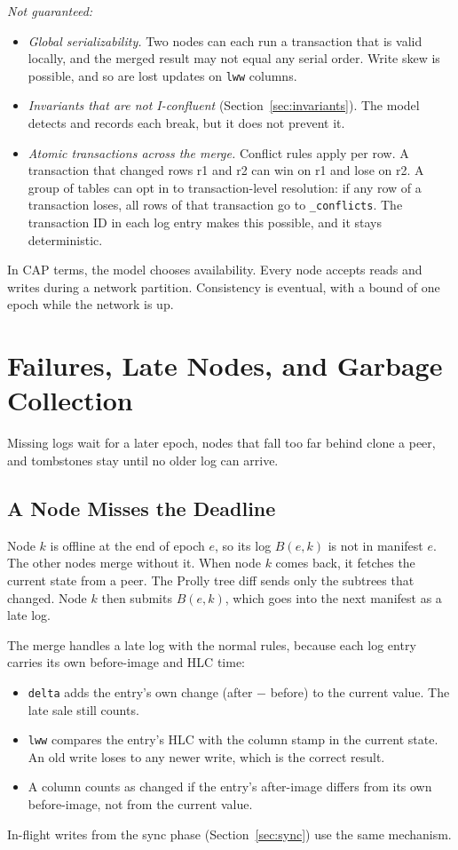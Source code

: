 \documentclass[journal]{IEEEtran}
\newcommand{\code}[1]{\texttt{#1}}
\begin{document}
\emph{Not guaranteed:}
\begin{itemize}
\item \emph{Global serializability.} Two nodes can each run a transaction that is valid locally, and the merged result may not equal any serial order. Write skew is possible, and so are lost updates on \code{lww} columns.
\item \emph{Invariants that are not I-confluent} (Section~\ref{sec:invariants}). The model detects and records each break, but it does not prevent it.
\item \emph{Atomic transactions across the merge.} Conflict rules apply per row. A transaction that changed rows r1 and r2 can win on r1 and lose on r2. A group of tables can opt in to transaction-level resolution: if any row of a transaction loses, all rows of that transaction go to \code{\_conflicts}. The transaction ID in each log entry makes this possible, and it stays deterministic.
\end{itemize}
In CAP terms, the model chooses availability. Every node accepts reads and writes during a network partition. Consistency is eventual, with a bound of one epoch while the network is up.

\section{Failures, Late Nodes, and Garbage Collection}
Missing logs wait for a later epoch, nodes that fall too far behind clone a peer, and tombstones stay until no older log can arrive.

\subsection{A Node Misses the Deadline}\label{sec:late}
Node $k$ is offline at the end of epoch $e$, so its log $B(e,k)$ is not in manifest $e$. The other nodes merge without it. When node $k$ comes back, it fetches the current state from a peer. The Prolly tree diff sends only the subtrees that changed. Node $k$ then submits $B(e,k)$, which goes into the next manifest as a late log.

The merge handles a late log with the normal rules, because each log entry carries its own before-image and HLC time:
\begin{itemize}
\item \code{delta} adds the entry's own change (after $-$ before) to the current value. The late sale still counts.
\item \code{lww} compares the entry's HLC with the column stamp in the current state. An old write loses to any newer write, which is the correct result.
\item A column counts as changed if the entry's after-image differs from its own before-image, not from the current value.
\end{itemize}
In-flight writes from the sync phase (Section~\ref{sec:sync}) use the same mechanism.
\end{document}
